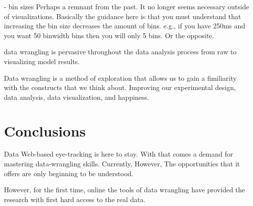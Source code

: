 - bin sizes
Perhaps a remnant from the past. It no longer seems necessary outside of visualizations. Basically the guidance here is that you must understand that increasing the bin size decreases the amount of bins. e.g., if you have 250ms and you want 50 binwidth bins then you will only  5 bins. Or the opposite.


data wrangling is pervasive throughout the data analysis process from raw to visualizing model results.

Data wrangling is a method of exploration that allows us to gain a fimiliarity with the constructs that we think about. Improving our experimental design, data analysis, data visualization, and happiness.

\section{Conclusions}
Data 
Web-based eye-tracking is here to stay. With that comes a demand for mastering data-wrangling skills. Currently, However, The opportunities that it offers are only beginning to be understood. 

However, for the first time, online the tools of data wrangling  have provided the research with first hard access to the real data.  




